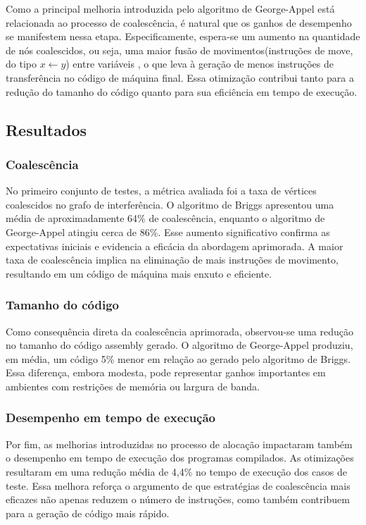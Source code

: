 Como a principal melhoria introduzida pelo algoritmo de George-Appel está relacionada ao processo de coalescência, é natural que os ganhos
de desempenho se manifestem nessa etapa. Especificamente, espera-se um aumento na quantidade de nós coalescidos, ou seja, uma maior fusão de
movimentos(instruções de move, do tipo $x \leftarrow y$) entre variáveis , o que leva à geração de menos instruções de transferência no código 
de máquina final. Essa otimização contribui tanto para a redução do tamanho do código quanto para sua eficiência em tempo de execução.

\subsection{Resultados}

\subsubsection{Coalescência}

No primeiro conjunto de testes, a métrica avaliada foi a taxa de vértices coalescidos no grafo de interferência. O algoritmo de Briggs
apresentou uma média de aproximadamente 64\% de coalescência, enquanto o algoritmo de George-Appel atingiu cerca de 86\%. Esse aumento significativo
confirma as expectativas iniciais e evidencia a eficácia da abordagem aprimorada. A maior taxa de coalescência implica na eliminação de mais instruções
de movimento, resultando em um código de máquina mais enxuto e eficiente.

\subsubsection{Tamanho do código}

Como consequência direta da coalescência aprimorada, observou-se uma redução no tamanho do código assembly gerado. O algoritmo de George-Appel produziu,
em média, um código 5\% menor em relação ao gerado pelo algoritmo de Briggs. Essa diferença, embora modesta, pode representar ganhos importantes
em ambientes com restrições de memória ou largura de banda.

\subsubsection{Desempenho em tempo de execução}

Por fim, as melhorias introduzidas no processo de alocação impactaram também o desempenho em tempo de execução dos programas compilados.
As otimizações resultaram em uma redução média de 4,4\% no tempo de execução dos casos de teste. Essa melhora reforça o argumento de que estratégias
de coalescência mais eficazes não apenas reduzem o número de instruções, como também contribuem para a geração de código mais rápido.
